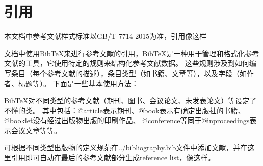 \section{引用}
本文档中参考文献样式标准以GB/T 7714-2015为准，引用像这样\cite{song_score-based_2020}  %

文档中使用BibTeX来进行参考文献的引用，BibTeX是一种用于管理和格式化参考文献的工具，它使用特定的规则来结构化参考文献数据。
这些规则涉及到如何编写条目（每个参考文献的描述），条目类型（如书籍、文章等），以及字段（如作者、标题等）。
下面是一些基本使用方法：

BibTeX对不同类型的参考文献（期刊、图书、会议论文、未发表论文）等设定了不懂的类。
其中包括：@article表示期刊、@book表示有确定出版社的书籍、@booklet没有经过出版物出版的印刷作品、
@conference等同于@inproceedings表示会议文章等等。

可根据不同类型出版物的定义规范在../bibliography.bib文件中添加文献，并在这里引用即可自动在最后的参考文献部分生成reference list，像这样\cite{example2019}。



